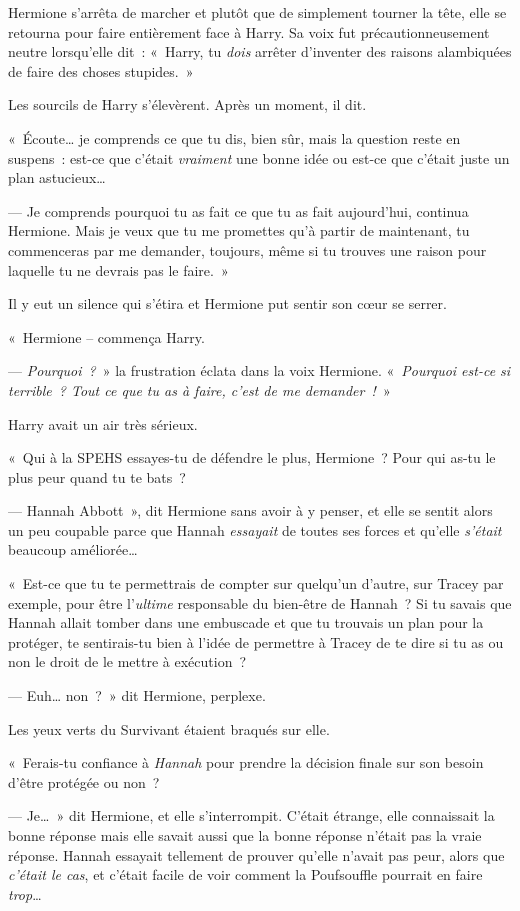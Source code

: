Hermione s'arrêta de marcher et plutôt que de simplement tourner la tête, elle se retourna pour faire entièrement face à Harry. Sa voix fut précautionneusement neutre lorsqu'elle dit~: «~Harry, tu \emph{dois} arrêter d'inventer des raisons alambiquées de faire des choses stupides.~»

Les sourcils de Harry s'élevèrent. Après un moment, il dit.

«~Écoute… je comprends ce que tu dis, bien sûr, mais la question reste en suspens~: est-ce que c'était \emph{vraiment} une bonne idée ou est-ce que c'était juste un plan astucieux…

--- Je comprends pourquoi tu as fait ce que tu as fait aujourd'hui, continua Hermione. Mais je veux que tu me promettes qu'à partir de maintenant, tu commenceras par me demander, toujours, même si tu trouves une raison pour laquelle tu ne devrais pas le faire.~»

Il y eut un silence qui s'étira et Hermione put sentir son cœur se serrer.

«~Hermione -- commença Harry.

--- \emph{Pourquoi~?}~» la frustration éclata dans la voix Hermione. «~\emph{Pourquoi est-ce si terrible~? Tout ce que tu as à faire, c'est de me demander~!}~»

Harry avait un air très sérieux.

«~Qui à la SPEHS essayes-tu de défendre le plus, Hermione~? Pour qui as-tu le plus peur quand tu te bats~?

--- Hannah Abbott~», dit Hermione sans avoir à y penser, et elle se sentit alors un peu coupable parce que Hannah \emph{essayait} de toutes ses forces et qu'elle \emph{s'était} beaucoup améliorée…

«~Est-ce que tu te permettrais de compter sur quelqu'un d'autre, sur Tracey par exemple, pour être l'\emph{ultime} responsable du bien-être de Hannah~? Si tu savais que Hannah allait tomber dans une embuscade et que tu trouvais un plan pour la protéger, te sentirais-tu bien à l'idée de permettre à Tracey de te dire si tu as ou non le droit de le mettre à exécution~?

--- Euh… non~?~» dit Hermione, perplexe.

Les yeux verts du Survivant étaient braqués sur elle.

«~Ferais-tu confiance à \emph{Hannah} pour prendre la décision finale sur son besoin d'être protégée ou non~?

--- Je…~» dit Hermione, et elle s'interrompit. C'était étrange, elle connaissait la bonne réponse mais elle savait aussi que la bonne réponse n'était pas la vraie réponse. Hannah essayait tellement de prouver qu'elle n'avait pas peur, alors que \emph{c'était le cas}, et c'était facile de voir comment la Poufsouffle pourrait en faire \emph{trop}…

